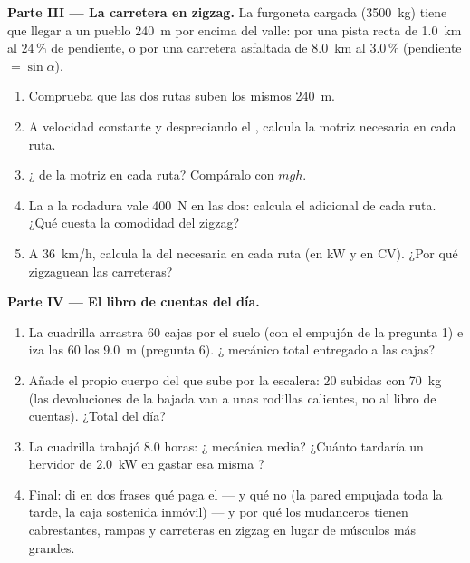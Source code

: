 \begin{problem}
\medskip
\noindent\textbf{Parte III --- La carretera en zigzag.}
La furgoneta cargada (\qty{3500}{kg}) tiene que llegar a un pueblo
\qty{240}{m} por encima del valle: por una pista recta de \qty{1.0}{km}
al $24\,\%$ de pendiente, o por una carretera asfaltada de \qty{8.0}{km}
al $3.0\,\%$ (pendiente $= \sin\alpha$).
\begin{enumerate}[resume]
  \item Comprueba que las dos rutas suben los mismos \qty{240}{m}.
  \item A velocidad constante y despreciando el , calcula la
         motriz necesaria en cada ruta.
  \item ¿ de la  motriz en cada ruta? Compáralo con $mgh$.
  \item La  a la rodadura vale \qty{400}{N} en las dos:
        calcula el  adicional de cada ruta. ¿Qué cuesta la
        comodidad del zigzag?
  \item A \qty{36}{km/h}, calcula la  del  necesaria en
        cada ruta (en \unit{kW} y en \unit{CV}). ¿Por qué zigzaguean las
        carreteras?
\end{enumerate}

\medskip
\noindent\textbf{Parte IV --- El libro de cuentas del día.}
\begin{enumerate}[resume]
  \item La cuadrilla arrastra $60$ cajas por el suelo (con el empujón de
        la pregunta 1) e iza las $60$ los \qty{9.0}{m} (pregunta 6).
        ¿ mecánico total entregado a las cajas?
  \item Añade el propio cuerpo del que sube por la escalera: $20$
        subidas con \qty{70}{kg} (las devoluciones de la bajada van a
        unas rodillas calientes, no al libro de cuentas). ¿Total del
        día?
  \item La cuadrilla trabajó $8.0$ horas: ¿ mecánica media?
        ¿Cuánto tardaría un hervidor de \qty{2.0}{kW} en gastar esa
        misma ?
  \item Final: di en dos frases qué paga el  --- y qué no (la pared
        empujada toda la tarde, la caja sostenida inmóvil) --- y por qué
        los mudanceros tienen cabrestantes, rampas y carreteras en
        zigzag en lugar de músculos más grandes.
\end{enumerate}
\end{problem}
